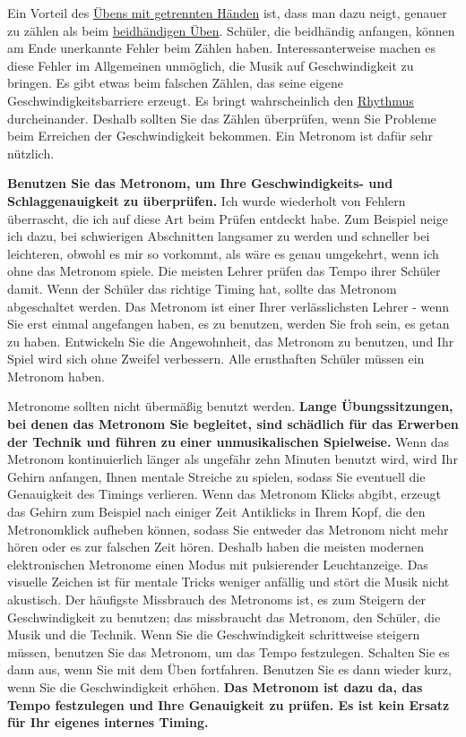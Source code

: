 Ein Vorteil des \hyperref[c1ii7]{Übens mit getrennten Händen} ist, dass man dazu neigt, genauer zu zählen als beim \hyperref[c1ii25]{beidhändigen Üben}.
Schüler, die beidhändig anfangen, können am Ende unerkannte Fehler beim Zählen haben.
Interessanterweise machen es diese Fehler im Allgemeinen unmöglich, die Musik auf Geschwindigkeit zu bringen.
Es gibt etwas beim falschen Zählen, das seine eigene Geschwindigkeitsbarriere erzeugt.
Es bringt wahrscheinlich den \hyperref[c1iii1b]{Rhythmus} durcheinander.
Deshalb sollten Sie das Zählen überprüfen, wenn Sie Probleme beim Erreichen der Geschwindigkeit bekommen.
Ein Metronom ist dafür sehr nützlich.

\textbf{Benutzen Sie das Metronom, um Ihre Geschwindigkeits- und Schlaggenauigkeit zu überprüfen.}
Ich wurde wiederholt von Fehlern überrascht, die ich auf diese Art beim Prüfen entdeckt habe.
Zum Beispiel neige ich dazu, bei schwierigen Abschnitten langsamer zu werden und schneller bei leichteren, obwohl es mir so vorkommt, als wäre es genau umgekehrt, wenn ich ohne das Metronom spiele.
Die meisten Lehrer prüfen das Tempo ihrer Schüler damit.
Wenn der Schüler das richtige Timing hat, sollte das Metronom abgeschaltet werden.
Das Metronom ist einer Ihrer verlässlichsten Lehrer - wenn Sie erst einmal angefangen haben, es zu benutzen, werden Sie froh sein, es getan zu haben.
Entwickeln Sie die Angewohnheit, das Metronom zu benutzen, und Ihr Spiel wird sich ohne Zweifel verbessern.
Alle ernsthaften Schüler müssen ein Metronom haben.

Metronome sollten nicht übermäßig benutzt werden.
\textbf{Lange Übungssitzungen, bei denen das Metronom Sie begleitet, sind schädlich für das Erwerben der Technik und führen zu einer unmusikalischen Spielweise.}
Wenn das Metronom kontinuierlich länger als ungefähr zehn Minuten benutzt wird, wird Ihr Gehirn anfangen, Ihnen mentale Streiche zu spielen, sodass Sie eventuell die Genauigkeit des Timings verlieren.
Wenn das Metronom Klicks abgibt, erzeugt das Gehirn zum Beispiel nach einiger Zeit Antiklicks in Ihrem Kopf, die den Metronomklick aufheben können, sodass Sie entweder das Metronom nicht mehr hören oder es zur falschen Zeit hören.
Deshalb haben die meisten modernen elektronischen Metronome einen Modus mit pulsierender Leuchtanzeige.
Das visuelle Zeichen ist für mentale Tricks weniger anfällig und stört die Musik nicht akustisch.
Der häufigste Missbrauch des Metronoms ist, es zum Steigern der Geschwindigkeit zu benutzen; das missbraucht das Metronom, den Schüler, die Musik und die Technik.
Wenn Sie die Geschwindigkeit schrittweise steigern müssen, benutzen Sie das Metronom, um das Tempo festzulegen.
Schalten Sie es dann aus, wenn Sie mit dem Üben fortfahren.
Benutzen Sie es dann wieder kurz, wenn Sie die Geschwindigkeit erhöhen.
\textbf{Das Metronom ist dazu da, das Tempo festzulegen und Ihre Genauigkeit zu prüfen.
Es ist kein Ersatz für Ihr eigenes internes Timing.}

